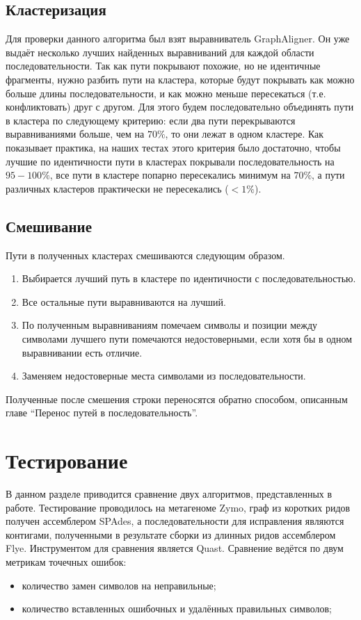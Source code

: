 \documentclass[14pt]{matmex-diploma-custom}
\begin{document}
\subsection{Кластеризация}
\begin{sloppypar}
Для проверки данного алгоритма был взят выравниватель GraphAligner. Он уже выдаёт несколько лучших найденных выравниваний для каждой области последовательности. Так как пути покрывают похожие, но не идентичные фрагменты, нужно разбить пути на кластера, которые будут покрывать как можно больше длины последовательности, и как можно меньше пересекаться (т.е. конфликтовать) друг с другом. Для этого будем последовательно объединять пути в кластера по следующему критерию: если два пути перекрываются выравниваниями больше, чем на $70\%$, то они лежат в одном кластере. Как показывает практика, на наших тестах этого критерия было достаточно, чтобы лучшие по идентичности пути в кластерах покрывали последовательность на $95-100\%$, все пути в кластере попарно пересекались минимум на $70\%$, а пути различных кластеров практически не пересекались ($<1\%$).
\end{sloppypar}

\subsection{Смешивание}
Пути в полученных кластерах смешиваются следующим образом.
\begin{enumerate}
    \item Выбирается лучший путь в кластере по идентичности с последовательностью.
    \item Все остальные пути выравниваются на лучший.
    \item По полученным выравниваниям помечаем символы и позиции между символами лучшего пути помечаются недостоверными, если хотя бы в одном выравнивании есть отличие.
    \item Заменяем недостоверные места символами из последовательности.
\end{enumerate}

Полученные после смешения строки переносятся обратно способом, описанным главе ``Перенос путей в последовательность''.

\section{Тестирование}
В данном разделе приводится сравнение двух алгоритмов, представленных в работе. Тестирование проводилось на метагеноме Zymo, граф из коротких ридов получен ассемблером SPAdes, а последовательности для исправления являются контигами, полученными в результате сборки из длинных ридов ассемблером Flye. Инструментом для сравнения является Quast. Сравнение ведётся по двум метрикам точечных ошибок: 
\begin{itemize}
    \item количество замен символов на неправильные;
    \item количество вставленных ошибочных и удалённых правильных символов;
\end{itemize}
\end{document}
